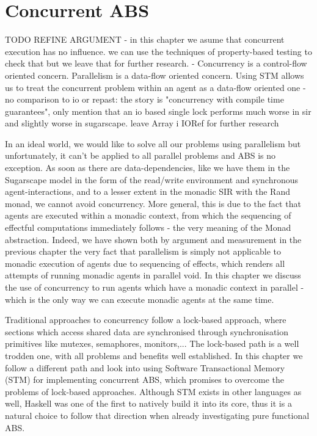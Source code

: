 \chapter{Concurrent ABS}
\label{ch:concurrent_abs}

TODO REFINE ARGUMENT
- in this chapter we asume that concurrent execution has no influence. we can use the techniques of property-based testing to check that but we leave that for further research.
-  Concurrency is a control-flow oriented concern. Parallelism is a data-flow oriented concern. Using STM allows us to treat the concurrent problem within an agent as a data-flow oriented one 
- no comparison to io or repast: the story is "concurrency with compile time guarantees", only mention that an io based single lock performs much worse in sir and slightly worse in sugarscape. leave Array i IORef for further research

In an ideal world, we would like to solve all our problems using parallelism but unfortunately, it can't be applied to all parallel problems and ABS is no exception. As soon as there are data-dependencies, like we have them in the Sugarscape model in the form of the read/write environment and synchronous agent-interactions, and to a lesser extent in the monadic SIR with the Rand monad, we cannot avoid concurrency. More general, this is due to the fact that agents are executed within a monadic context, from which the  sequencing of effectful computations immediately follows - the very meaning of the Monad abstraction. Indeed, we have shown both by argument and measurement in the previous chapter the very fact that parallelism is simply not applicable to monadic execution of agents due to sequencing of effects, which renders all attempts of running monadic agents in parallel void. In this chapter we discuss the use of concurrency to run agents which have a monadic context in parallel - which is the only way we can execute monadic agents at the same time.

\medskip

Traditional approaches to concurrency follow a lock-based approach, where sections which access shared data are synchronised through synchronisation primitives like mutexes, semaphores, monitors,... The lock-based path is a well trodden one, with all problems and benefits well established. In this chapter we follow a different path and look into using Software Transactional Memory (STM) for implementing concurrent ABS, which promises to overcome the problems of lock-based approaches. Although STM exists in other languages as well, Haskell was one of the first to natively build it into its core, thus it is a natural choice to follow that direction when already investigating pure functional ABS.

